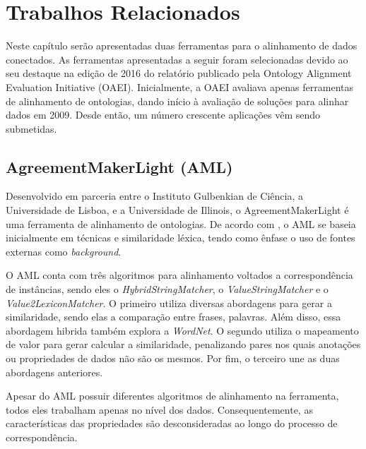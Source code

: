 \chapter{Trabalhos Relacionados}
% 
% 
\label{cap:relacionados}
Neste capítulo serão apresentadas duas ferramentas para o alinhamento de dados conectados. As ferramentas apresentadas a seguir foram selecionadas devido ao seu destaque na edição de 2016 do relatório publicado pela Ontology Alignment Evaluation Initiative (OAEI). Inicialmente, a OAEI avaliava apenas ferramentas de alinhamento de ontologias, dando início à avaliação de soluções para alinhar dados em 2009. Desde então, um número crescente aplicações vêm sendo submetidas.
% 
% 
% 
% 

\section{AgreementMakerLight (AML)}
Desenvolvido em parceria entre o Instituto Gulbenkian de Ciência, a Universidade de Lisboa, e a Universidade de Illinois, o AgreementMakerLight é uma ferramenta de alinhamento de ontologias. De acordo com \cite{fariaoaei}, o AML se baseia inicialmente em técnicas e similaridade léxica, tendo como ênfase o uso de fontes externas como \textit{background}.

O AML conta com três algoritmos para alinhamento voltados a correspondência de instâncias, sendo eles o \textit{HybridStringMatcher}, o \textit{ValueStringMatcher} e o \textit{Value2LexiconMatcher}. O primeiro utiliza diversas abordagens para gerar a similaridade, sendo elas a comparação entre frases, palavras. Além disso, essa abordagem hibrida também explora a \textit{WordNet}. O segundo utiliza o mapeamento de valor para gerar calcular a similaridade, penalizando pares nos quais anotações ou propriedades de dados não são os mesmos. Por fim, o terceiro une as duas abordagens anteriores.

Apesar do AML possuir diferentes algoritmos de alinhamento na ferramenta, todos eles trabalham apenas no nível dos dados. Consequentemente, as características das propriedades são desconsideradas ao longo do processo de correspondência.

